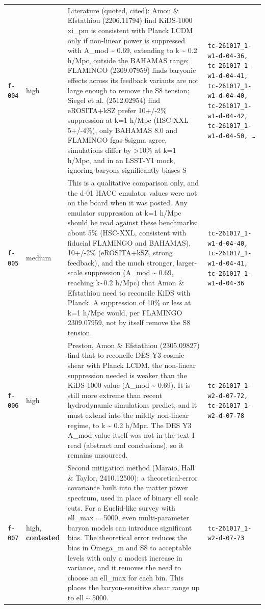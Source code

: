 \documentclass[11pt,a4paper]{article}
\begin{document}
\begin{longtable}{@{}p{}p{}p{}p{}@{}}
\texttt{f-004} & high & Literature (quoted, cited): Amon \& Efstathiou (2206.11794) find KiDS-1000 xi\_pm is consistent with Planck LCDM only if non-linear power is suppressed with A\_mod \textasciitilde{} 0.69, extending to k \textasciitilde{} 0.2 h/Mpc, outside the BAHAMAS range; FLAMINGO (2309.07959) finds baryonic effects across its feedback variants are not large enough to remove the S8 tension; Siegel et al. (2512.02954) find eROSITA+kSZ prefer 10+/-2\% suppression at k=1 h/Mpc (HSC-XXL 5+/-4\%), only BAHAMAS 8.0 and FLAMINGO fgas-8sigma agree, simulations differ by \textgreater{}10\% at k=1 h/Mpc, and in an LSST-Y1 mock, ignoring baryons significantly biases S & \texttt{tc-261017\_\allowbreak{}1-w1-d-04-36,\allowbreak{} tc-261017\_\allowbreak{}1-w1-d-04-41,\allowbreak{} tc-261017\_\allowbreak{}1-w1-d-04-40,\allowbreak{} tc-261017\_\allowbreak{}1-w1-d-04-42,\allowbreak{} tc-261017\_\allowbreak{}1-w1-d-04-50,\allowbreak{} \ldots{}\allowbreak{}} \\
\texttt{f-005} & medium & This is a qualitative comparison only, and the d-01 HACC emulator values were not on the board when it was posted. Any emulator suppression at k=1 h/Mpc should be read against these benchmarks: about 5\% (HSC-XXL, consistent with fiducial FLAMINGO and BAHAMAS), 10+/-2\% (eROSITA+kSZ, strong feedback), and the much stronger, larger-scale suppression (A\_mod \textasciitilde{} 0.69, reaching k\textasciitilde{}0.2 h/Mpc) that Amon \& Efstathiou need to reconcile KiDS with Planck. A suppression of 10\% or less at k=1 h/Mpc would, per FLAMINGO 2309.07959, not by itself remove the S8 tension. & \texttt{tc-261017\_\allowbreak{}1-w1-d-04-40,\allowbreak{} tc-261017\_\allowbreak{}1-w1-d-04-41,\allowbreak{} tc-261017\_\allowbreak{}1-w1-d-04-36} \\
\texttt{f-006} & high & Preston, Amon \& Efstathiou (2305.09827) find that to reconcile DES Y3 cosmic shear with Planck LCDM, the non-linear suppression needed is weaker than the KiDS-1000 value (A\_mod \textasciitilde{} 0.69). It is still more extreme than recent hydrodynamic simulations predict, and it must extend into the mildly non-linear regime, to k \textasciitilde{} 0.2 h/Mpc. The DES Y3 A\_mod value itself was not in the text I read (abstract and conclusions), so it remains unsourced. & \texttt{tc-261017\_\allowbreak{}1-w2-d-07-72,\allowbreak{} tc-261017\_\allowbreak{}1-w2-d-07-78} \\
\texttt{f-007} & high, \textbf{contested} & Second mitigation method (Maraio, Hall \& Taylor, 2410.12500): a theoretical-error covariance built into the matter power spectrum, used in place of binary ell scale cuts. For a Euclid-like survey with ell\_max = 5000, even multi-parameter baryon models can introduce significant bias. The theoretical error reduces the bias in Omega\_m and S8 to acceptable levels with only a modest increase in variance, and it removes the need to choose an ell\_max for each bin. This places the baryon-sensitive shear range up to ell \textasciitilde{} 5000. & \texttt{tc-261017\_\allowbreak{}1-w2-d-07-73} \\

\end{longtable}
\end{document}
